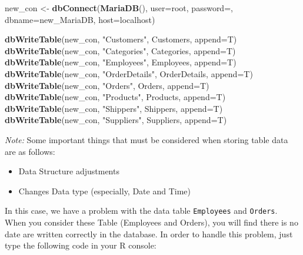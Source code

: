 \documentclass[
]{book}
\newenvironment{Shaded}{\begin{snugshade}}{\end{snugshade}}
\newcommand{\AttributeTok}[1]{\textcolor[rgb]{0.13,0.29,0.53}{#1}}
\newcommand{\FunctionTok}[1]{\textcolor[rgb]{0.13,0.29,0.53}{\textbf{#1}}}
\newcommand{\NormalTok}[1]{#1}
\newcommand{\OtherTok}[1]{\textcolor[rgb]{0.56,0.35,0.01}{#1}}
\newcommand{\StringTok}[1]{\textcolor[rgb]{0.31,0.60,0.02}{#1}}
\providecommand{\tightlist}{%
  \setlength{\itemsep}{0pt}\setlength{\parskip}{0pt}}
\begin{document}
\begin{Shaded}
\begin{Highlighting}[]
\NormalTok{new\_con }\OtherTok{\textless{}{-}} \FunctionTok{dbConnect}\NormalTok{(}\FunctionTok{MariaDB}\NormalTok{(), }
                  \AttributeTok{user=}\StringTok{\textquotesingle{}root\textquotesingle{}}\NormalTok{,}
                  \AttributeTok{password=}\StringTok{\textquotesingle{}\textquotesingle{}}\NormalTok{, }
                  \AttributeTok{dbname=}\StringTok{\textquotesingle{}new\_MariaDB\textquotesingle{}}\NormalTok{, }
                  \AttributeTok{host=}\StringTok{\textquotesingle{}localhost\textquotesingle{}}\NormalTok{)}

\FunctionTok{dbWriteTable}\NormalTok{(new\_con, }\StringTok{"Customers"}\NormalTok{, Customers, }\AttributeTok{append=}\NormalTok{T) }
\FunctionTok{dbWriteTable}\NormalTok{(new\_con, }\StringTok{"Categories"}\NormalTok{, Categories, }\AttributeTok{append=}\NormalTok{T) }
\FunctionTok{dbWriteTable}\NormalTok{(new\_con, }\StringTok{"Employees"}\NormalTok{, Employees, }\AttributeTok{append=}\NormalTok{T) }
\FunctionTok{dbWriteTable}\NormalTok{(new\_con, }\StringTok{"OrderDetails"}\NormalTok{, OrderDetails, }\AttributeTok{append=}\NormalTok{T) }
\FunctionTok{dbWriteTable}\NormalTok{(new\_con, }\StringTok{"Orders"}\NormalTok{, Orders, }\AttributeTok{append=}\NormalTok{T) }
\FunctionTok{dbWriteTable}\NormalTok{(new\_con, }\StringTok{"Products"}\NormalTok{, Products, }\AttributeTok{append=}\NormalTok{T) }
\FunctionTok{dbWriteTable}\NormalTok{(new\_con, }\StringTok{"Shippers"}\NormalTok{, Shippers, }\AttributeTok{append=}\NormalTok{T) }
\FunctionTok{dbWriteTable}\NormalTok{(new\_con, }\StringTok{"Suppliers"}\NormalTok{, Suppliers, }\AttributeTok{append=}\NormalTok{T) }
\end{Highlighting}
\end{Shaded}

\emph{Note:} Some important things that must be considered when storing table data are as follows:

\begin{itemize}
\tightlist
\item
  Data Structure adjustments
\item
  Changes Data type (especially, Date and Time)
\end{itemize}

In this case, we have a problem with the data table \texttt{Employees} and \texttt{Orders}. When you consider these Table (Employees and Orders), you will find there is no date are written correctly in the database. In order to handle this problem, just type the following code in your R console:
\end{document}
